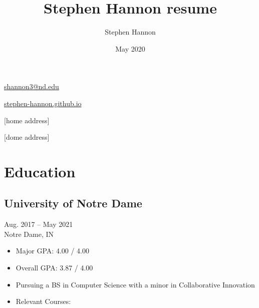 \documentclass[letterpaper]{article}
\title{Stephen Hannon resume}
\author{Stephen Hannon}
\date{May 2020}
\begin{document}
\begin{minipage}[t]{\dimexpr.33\textwidth-.5\columnsep}

{\ttfamily\large\raggedleft
    [phone]

    \href{mailto:shannon3@nd.edu}{shannon3@nd.edu}

    \href{https://stephen-hannon.github.io}{stephen-hannon.github.io}
    
    [home address]
    
    [dome address]

}

\section{Education}
\subsection{University of Notre Dame}

{\raggedleft
Aug. 2017 -- May 2021 \\
Notre Dame, IN

}

\begin{itemize}
    \item Major GPA: 4.00 / 4.00
    \item Overall GPA: 3.87 / 4.00
    \item Pursuing a BS in Computer Science with a minor in Collaborative Innovation
    \item Relevant Courses:
\end{itemize}


\end{minipage}
\end{document}
